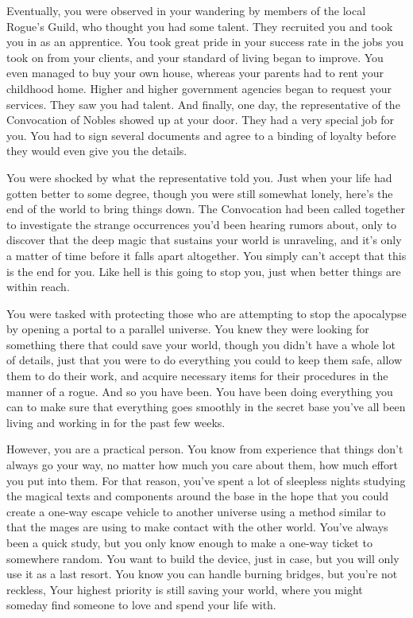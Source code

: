 \documentclass[char]{guildcamp3}
\begin{document}
Eventually, you were observed in your wandering by members of the local Rogue's Guild, who thought you had some talent. They recruited you and took you in as an apprentice. You took great pride in your success rate in the jobs you took on from your clients, and your standard of living began to improve. You even managed to buy your own house, whereas your parents had to rent your childhood home. Higher and higher government agencies began to request your services. They saw you had talent. And finally, one day, the representative of the Convocation of Nobles showed up at your door. They had a very special job for you. You had to sign several documents and agree to a binding of loyalty before they would even give you the details.

You were shocked by what the representative told you. Just when your life had gotten better to some degree, though you were still somewhat lonely, here's the end of the world to bring things down. The Convocation had been called together to investigate the strange occurrences you'd been hearing rumors about, only to discover that the deep magic that sustains your world is unraveling, and it's only a matter of time before it falls apart altogether. You simply can't accept that this is the end for you. Like hell is this going to stop you, just when better things are within reach. 

You were tasked with protecting those who are attempting to stop the apocalypse by opening a portal to a parallel universe. You knew they were looking for something there that could save your world, though you didn't have a whole lot of details, just that you were to do everything you could to keep them safe, allow them to do their work, and acquire necessary items for their procedures in the manner of a rogue. And so you have been. You have been doing everything you can to make sure that everything goes smoothly in the secret base you've all been living and working in for the past few weeks.

However, you are a practical person. You know from experience that things don't always go your way, no matter how much you care about them, how much effort you put into them. For that reason, you've spent a lot of sleepless nights studying the magical texts and components around the base in the hope that you could create a one-way escape vehicle to another universe using a method similar to that the mages are using to make contact with the other world. You've always been a quick study, but you only know enough to make a one-way ticket to somewhere random. You want to build the device, just in case, but you will only use it as a last resort. You know you can handle burning bridges, but you're not reckless, Your highest priority is still saving your world, where you might someday find someone to love and spend your life with.
\end{document}
